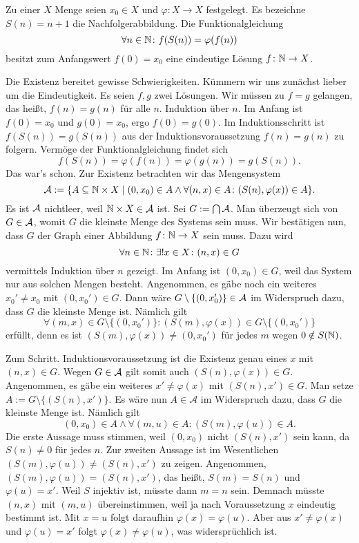 \begin{Satz}\newlinefirst
Zu einer $X$ Menge seien $x_0\in X$ und $\varphi\colon X\to X$
festgelegt. Es bezeichne $S(n)=n+1$ die Nachfolgerabbildung. Die
Funktionalgleichung
\[\forall n\in\mathbb N\colon f(S(n)) = \varphi(f(n))\]
besitzt zum Anfangswert $f(0)=x_0$ eine eindeutige Lösung
$f\colon\mathbb N\to X$.
\end{Satz}
\begin{Beweis}[Beweis]
Die Existenz bereitet gewisse Schwierigkeiten. Kümmern wir uns
zunächst lieber um die Eindeutigkeit. Es seien $f,g$ zwei Lösungen.
Wir müssen zu $f=g$ gelangen, das heißt, $f(n)=g(n)$ für alle $n$.
Induktion über $n$. Im Anfang ist $f(0)=x_0$ und $g(0)=x_0$, ergo
$f(0)=g(0)$. Im Induktionsschritt ist $f(S(n))=g(S(n))$ aus der
Induktionsvoraussetzung $f(n)=g(n)$ zu folgern. Vermöge der
Funktionalgleichung findet sich
\[f(S(n)) = \varphi(f(n)) = \varphi(g(n)) = g(S(n)).\]
Das war's schon. Zur Existenz betrachten wir das Mengensystem
\[\mathcal{A} := \{A\subseteq\mathbb N\times X\mid (0,x_0)\in A\land
\forall (n,x)\in A\colon (S(n),\varphi(x))\in A\}.\]
Es ist $\mathcal{A}$ nichtleer, weil $\mathbb N\times X\in\mathcal{A}$ ist.
Sei $G:=\bigcap\mathcal{A}$. Man überzeugt sich von $G\in\mathcal{A}$,
womit $G$ die kleinste Menge des Systems sein muss. Wir bestätigen
nun, dass $G$ der Graph einer Abbildung $f\colon\mathbb N\to X$ sein muss. Dazu
wird
\[\forall n\in\mathbb N\colon\exists! x\in X\colon (n,x)\in G\]
vermittels Induktion über $n$ gezeigt. Im Anfang ist $(0,x_0)\in G$,
weil das System nur aus solchen Mengen besteht. Angenommen, es gäbe
noch ein weiteres $x_0'\ne x_0$ mit $(0,x_0')\in G$. Dann wäre
$G\setminus\{(0,x_0')\}\in\mathcal{A}$ im Widerspruch dazu, dass $G$
die kleinste Menge ist. Nämlich gilt
\[\forall (m,x)\in G\setminus\{(0,x_0')\}\colon
(S(m),\varphi(x))\in G\setminus\{(0,x_0')\}\]
erfüllt, denn es ist $(S(m),\varphi(x))\ne (0,x_0')$ für jedes $m$
wegen $0\notin S(\mathbb N)$.

Zum Schritt. Induktionsvoraussetzung ist die Existenz genau eines $x$
mit $(n,x)\in G$. Wegen $G\in\mathcal{A}$ gilt somit auch
$(S(n),\varphi(x))\in G$. Angenommen, es gäbe ein weiteres
$x'\ne\varphi(x)$ mit $(S(n),x')\in G$. Man setze
$A:=G\setminus\{(S(n),x')\}$. Es wäre nun $A\in\mathcal A$ im
Widerspruch dazu, dass $G$ die kleinste Menge ist. Nämlich gilt
\[(0,x_0)\in A\land\forall (m,u)\in A\colon (S(m),\varphi(u))\in A.\]
Die erste Aussage muss stimmen, weil $(0,x_0)$ nicht $(S(n),x')$ sein kann,
da $S(n)\ne 0$ für jedes $n$. Zur zweiten Aussage ist im Wesentlichen
$(S(m),\varphi(u))\ne (S(n),x')$ zu zeigen.
Angenommen, $(S(m),\varphi(u)) = (S(n),x')$, das heißt,
$S(m)=S(n)$ und $\varphi(u)=x'$. Weil $S$ injektiv ist, müsste dann
$m=n$ sein. Demnach müsste $(n,x)$ mit $(m,u)$ übereinstimmen, weil ja
nach Voraussetzung $x$ eindeutig bestimmt ist. Mit $x=u$ folgt daraufhin
$\varphi(x)=\varphi(u)$. Aber aus $x'\ne\varphi(x)$ und $\varphi(u)=x'$
folgt $\varphi(x)\ne\varphi(u)$, was widersprüchlich ist.


\end{Beweis}
